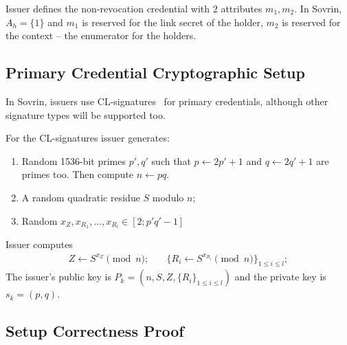 Issuer defines the non-revocation credential  with $2$ attributes $m_1,m_2$. In Sovrin, $A_h = \{1\}$ and $m_1$ is reserved for the link secret of the holder, $m_2$ is reserved for the context -- the enumerator for the holders.


\subsection{Primary Credential Cryptographic Setup}\label{sec:setup-key1}
In Sovrin, issuers use CL-signatures~\cite{CamenischL02, Camenisch2004} for primary credentials, although other signature types will be supported too.

For the CL-signatures issuer generates:
\begin{enumerate}
    \item Random 1536-bit primes $p',q'$ such that  $p \leftarrow 2p'+1$ and $q \leftarrow 2q'+1$ are primes too. Then compute $n \leftarrow pq$.
    \item A random quadratic residue  $S$ modulo $n$;
    \item Random $x_Z, x_{R_1},\ldots , x_{R_l}\in [2; p'q'-1]$
\end{enumerate}
Issuer computes
\begin{align}
    Z \leftarrow S^{x_Z}\pmod{n};&\quad \{R_i \leftarrow S^{x_{R_i}}\pmod{n}\}_{1\leq i \leq l};
\end{align}
The issuer's public key is $P_k = (n, S,Z,\{R_i\}_{1 \leq i\leq l})$ and the private key is $s_k = (p, q)$.\\
\subsection{Setup Correctness Proof}\label{sec:setup-proof}
